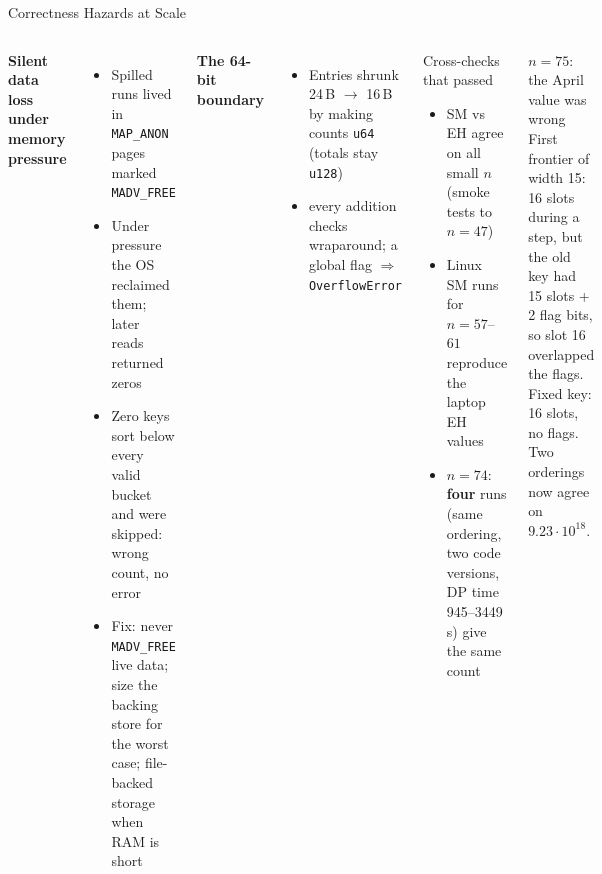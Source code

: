 \documentclass[aspectratio=169,t]{beamer}
\begin{document}
\begin{frame}{Correctness Hazards at Scale}
\footnotesize
\begin{columns}[t]
\textbf{Silent data loss under memory pressure}
\begin{itemize}
  \item Spilled runs lived in \texttt{MAP\_ANON} pages marked \texttt{MADV\_FREE}
  \item Under pressure the OS reclaimed them; later reads returned \alert{zeros}
  \item Zero keys sort below every valid bucket and were \alert{skipped}:
        wrong count, no error
  \item Fix: never \texttt{MADV\_FREE} live data; size the backing store for the
        worst case; file-backed storage when RAM is short
\end{itemize}

\vspace{0.1cm}
\textbf{The 64-bit boundary}
\begin{itemize}
  \item Entries shrunk 24\,B $\to$ 16\,B by making counts \texttt{u64}
        (totals stay \texttt{u128})
  \item every addition checks wraparound; a global flag
        $\Rightarrow$ \texttt{OverflowError}
\end{itemize}

\begin{block}{Cross-checks that passed}
  \begin{itemize}
    \item SM vs EH agree on all small $n$ (smoke tests to $n=47$)
    \item Linux SM runs for $n=57$--$61$ reproduce the laptop EH values
    \item $n=74$: \textbf{four} runs (same ordering, two code versions,
          DP time 945--3449\,s) give the same count
  \end{itemize}
\end{block}

\vspace{0.1cm}
\begin{alertblock}{$n=75$: the April value was wrong}
  First frontier of width 15: 16 slots during a step, but the old key had
  15 slots + 2 flag bits, so slot 16 overlapped the flags. Fixed key: 16 slots,
  no flags. Two orderings now agree on $9.23\cdot10^{18}$.
\end{alertblock}
\end{columns}
\end{frame}
\end{document}
